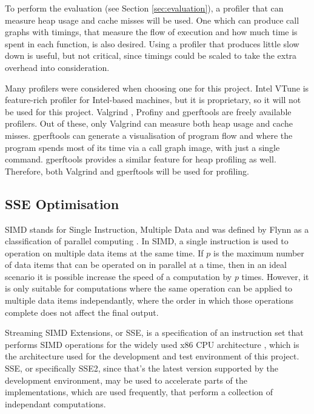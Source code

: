 To perform the evaluation (see Section \ref{sec:evaluation}), a profiler that can measure heap usage and cache misses will be used. One which can produce call graphs with timings, that measure the flow of execution and how much time is spent in each function, is also desired. Using a profiler that produces little slow down is useful, but not critical, since timings could be scaled to take the extra overhead into consideration. 

Many profilers were considered when choosing one for this project. Intel VTune \cite{intel-vtune} is feature-rich profiler for Intel-based machines, but it is proprietary, so it will not be used for this project. Valgrind \cite{valgrind}, Profiny \cite{profiny} and gperftools \cite{gperftools} are freely available profilers. Out of these, only Valgrind can measure both heap usage and cache misses. gperftools can generate a visualisation of program flow and where the program spends most of its time via a call graph image, with just a single command. gperftools provides a similar feature for heap profiling as well. Therefore, both Valgrind and gperftools will be used for profiling.

\subsection{SSE Optimisation}
\label{sec:sse}

SIMD stands for Single Instruction, Multiple Data and was defined by Flynn as a classification of parallel computing \cite{flynns-taxonomy}. In SIMD, a single instruction is used to operation on multiple data items at the same time. If $p$ is the maximum number of data items that can be operated on in parallel at a time, then in an ideal scenario it is possible increase the speed of a computation by $p$ times. However, it is only suitable for computations where the same operation can be applied to multiple data items independantly, where the order in which those operations complete does not affect the final output.

Streaming SIMD Extensions, or SSE, is a specification of an instruction set that performs SIMD operations for the widely used x86 CPU architecture \cite{sse}, which is the architecture used for the development and test environment of this project. SSE, or specifically SSE2, since that's the latest version supported by the development environment, may be used to accelerate parts of the implementations, which are used frequently, that perform a collection of independant computations.